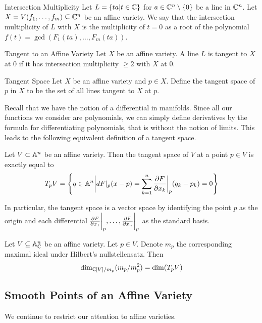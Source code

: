 \documentclass[a4paper]{article}
\begin{document}
\begin{defn}{Intersection Multiplicity}{} Let $L=\{ta|t\in\mathbb{C}\}$ for $a\in\mathbb{C}^n\setminus\{0\}$ be a line in $\mathbb{C}^n$. Let $X=V(f_1,\dots,f_m)\subseteq\mathbb{C}^n$ be an affine variety. We say that the intersection multiplicity of $L$ with $X$ is the multiplicity of $t=0$ as a root of the polynomial $f(t)=\gcd(F_1(ta),\dots,F_m(ta))$. 
\end{defn}

\begin{defn}{Tangent to an Affine Variety}{} Let $X$ be an affine variety. A line $L$ is tangent to $X$ at $0$ if it has intersection multiplicity $\geq 2$ with $X$ at $0$. 
\end{defn}

\begin{defn}{Tangent Space}{} Let $X$ be an affine variety and $p\in X$. Define the tangent space of $p$ in $X$ to be the set of all lines tangent to $X$ at $p$. 
\end{defn}

Recall that we have the notion of a differential in manifolds. Since all our functions we consider are polynomials, we can simply define derivatives by the formula for differentiating polynomials, that is without the notion of limits. This leads to the following equivalent definition of a tangent space. 

\begin{prp}{}{} Let $V\subset\mathbb{A}^n$ be an affine variety. Then the tangent space of $V$ at a point $p\in V$ is exactly equal to $$T_pV=\left\{q\in\mathbb{A}^n\bigg{|}dF|_p(x-p)=\sum_{k=1}^n\frac{\partial F}{\partial x_k}\bigg{|}_p(q_k-p_k)=0\right\}$$
\end{prp}

In particular, the tangent space is a vector space by identifying the point $p$ as the origin and each differential $\frac{\partial F}{\partial x_1}\bigg{|}_p,\dots,\frac{\partial F}{\partial x_n}\bigg{|}_p$ as the standard basis. 

\begin{prp}{}{} Let $V\subseteq\mathbb{A}_{\mathbb{C}}^n$ be an affine variety. Let $p\in V$. Denote $m_p$ the corresponding maximal ideal under Hilbert's nullstellensatz. Then $$\dim_{\mathbb{C}[V]/m_p}(m_p/m_p^2)=\dim(T_pV)$$
\end{prp}

\subsection{Smooth Points of an Affine Variety}
We continue to restrict our attention to affine varieties. 
\end{document}
